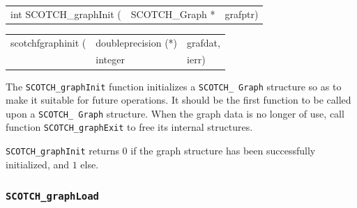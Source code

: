 \begin{itemize}
\progsyn

{\tt\begin{tabular}{l@{}ll}
int SCOTCH\_graphInit ( & SCOTCH\_Graph * & grafptr)
\end{tabular}}

{\tt\begin{tabular}{l@{}ll}
scotchfgraphinit ( & doubleprecision (*) & grafdat, \\
                   & integer             & ierr)
\end{tabular}}

\progdes

The {\tt SCOTCH\_graphInit} function initializes a {\tt SCOTCH\_\lbt
Graph} structure so as to make it suitable for future operations. It
should be the first function to be called upon a {\tt SCOTCH\_\lbt
Graph} structure. When the graph data is no longer of use, call
function {\tt SCOTCH\_\lbt graph\lbt Exit} to free its internal
structures.

\progret

{\tt SCOTCH\_graphInit} returns $0$ if the graph structure has been
successfully initialized, and $1$ else.
\end{itemize}

\subsubsection{{\tt SCOTCH\_graphLoad}}
\label{sec-lib-func-graphload}

